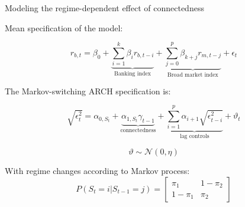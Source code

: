 \documentclass{beamer}
\begin{document}
\begin{frame}{Modeling the regime-dependent effect of connectedness}

Mean specification of the model: 

$$r_{b,t} = \beta_0 + \underbrace{\sum_{i=1}^{k}\beta_i r_{b, t-i}}_{\text{Banking index}} + \underbrace{\sum_{j=0}^{p}\beta_{k+j} r_{m, t-j}}_{\text{Broad market index}} + \epsilon_t	$$

The Markov-switching ARCH specification is:


$$\sqrt{\epsilon^{2}_t} = \alpha_{0,S_t} + \underbrace{\alpha_{1,S_t} \gamma_{t-1}}_{\text{connectedness}} + \underbrace{\sum_{i=1}^{p} \alpha_{i+1} \sqrt{\epsilon^2_{t-i}}}_{\text{lag controls}} + \vartheta_t$$

$$\vartheta \sim \mathcal{N}(0, \eta)$$




With regime changes according to Markov process: \begin{equation*}
    P(S_t = i | S_{t-1} = j) = \begin{bmatrix}
      \pi_1 & 1 - \pi_2\\
        1 - \pi_1 & \pi_2
        \end{bmatrix}
\end{equation*}

\end{frame}
\end{document}
